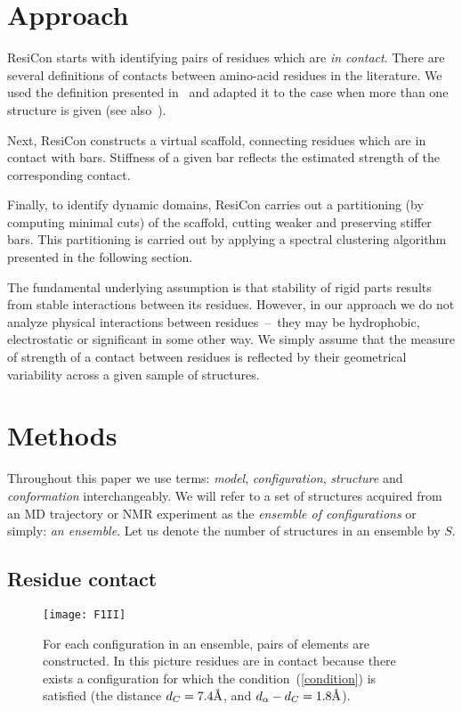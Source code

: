 \section{Approach} 
ResiCon starts with identifying pairs of residues which are \emph{in contact}.
There are several definitions of contacts between amino-acid residues in the literature.
We used the definition presented in~\cite{daniluk2011novel} and adapted it to the case when more than one structure is given (see also~\cite{daniluk2014theoretical}).

Next, ResiCon constructs a virtual scaffold, connecting residues which are in contact with bars.
Stiffness of a given bar reflects the estimated strength of the corresponding contact. 

Finally, to identify dynamic domains, ResiCon carries out a partitioning (by computing minimal cuts) of the scaffold, cutting weaker and preserving stiffer bars.
This partitioning is carried out by applying a spectral clustering algorithm presented in the following section.

The fundamental underlying assumption is that stability of rigid parts results from stable interactions between its residues.
However, in our approach we do not analyze physical interactions between residues~--~they may be hydrophobic, electrostatic or significant in some other way.
We simply assume that the measure of strength of a contact between residues is reflected by their geometrical variability across a given sample of structures.

\section{Methods}
Throughout this paper we use terms: \emph{model}, \emph{configuration}, \emph{structure} and \emph{conformation} interchangeably.
We will refer to a set of structures acquired from an MD trajectory or NMR experiment as the \emph{ensemble of configurations} or simply: \emph{an ensemble}.
Let us denote the number of structures in an ensemble by $S$.

\subsection*{Residue contact}
\begin{figure}
\centering
\texttt{[image: F1II]}
\caption{
For each configuration in an ensemble, pairs of elements are constructed.
In this picture residues are in contact because there exists a configuration for which the condition~(\ref{condition}) is satisfied (the distance $d_C=7.4\mbox{\normalfont\AA}$, and $d_\alpha-d_C = 1.8\mbox{\normalfont\AA}$).
}
\label{contact}
\end{figure}


